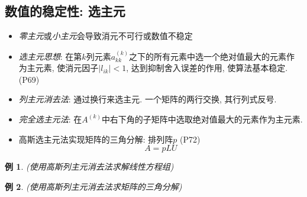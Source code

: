 \documentclass[twoside]{article}
\newtheorem{eg}{例}[section]
\begin{document}
\subsection{数值的稳定性: 选主元}
\begin{itemize}
  \item \textit{零主元}或\textit{小主元}会导致消元不可行或数值不稳定
  \item \textit{选主元思想}: 在第$k$列元素$a^{(k)}_{kk}$之下的所有元素中选一个绝对值最大的元素作为主元素, 使消元因子$|l_{ik}|<1$, 达到抑制舍入误差的作用, 使算法基本稳定. (P69)
  \item \textit{列主元消去法}: 通过换行来选主元. 一个矩阵的两行交换, 其行列式反号.
  \item \textit{完全选主元法}: 在$A^{(k)}$中右下角的子矩阵中选取绝对值最大的元素作为主元素.
  \item 高斯选主元法实现矩阵的三角分解: 排列阵$p$ (P72)
    \begin{equation}
      A=pLU
    \end{equation}
\end{itemize}
\begin{eg}
  (使用高斯列主元消去法求解线性方程组)
\end{eg}
\begin{eg}
  (使用高斯列主元消去法求矩阵的三角分解)
\end{eg}
\end{document}
